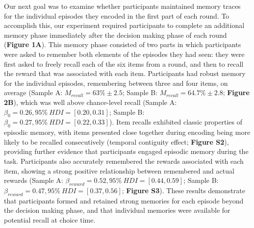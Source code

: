 \documentclass[10pt,letterpaper]{article}
\begin{document}
Our next goal was to examine whether participants maintained memory traces for the individual episodes they encoded in the first part of each round. To accomplish this, our experiment required participants to complete an additional memory phase immediately after the decision making phase of each round (\textbf{Figure 1A}). This memory phase consisted of two parts in which participants were asked to remember both elements of the episodes they had seen: they were first asked to freely recall each of the six items from a round, and then to recall the reward that was associated with each item. Participants had robust memory for the individual episodes, remembering between three and four items, on average (Sample A: $M_{recall} = 63\% \pm 2.5$; Sample B: $M_{recall} = 64.7\% \pm 2.8$; \textbf{Figure 2B}), which was well above chance-level recall (Sample A: $\beta_{0} = 0.26, 95\% \ HDI = [0.20, 0.31]$; Sample B: $\beta_{0} = 0.27, 95\% \ HDI = [0.22, 0.33]$). Item recalls exhibited classic properties of episodic memory, with items presented close together during encoding being more likely to be recalled consecutively (temporal contiguity effect\cite{kahanaFoundationsHumanMemory2012}; \textbf{Figure S2}), providing further evidence that participants engaged episodic memory during the task. Participants also accurately remembered the rewards associated with each item, showing a strong positive relationship between remembered and actual rewards (Sample A: $\beta_{reward} = 0.52, 95\% \ HDI = [0.44, 0.59]$; Sample B: $\beta_{reward} = 0.47, 95\% \ HDI = [0.37, 0.56]$; \textbf{Figure S3}). These results demonstrate that participants formed and retained strong memories for each episode beyond the decision making phase, and that individual memories were available for potential recall at choice time.
\end{document}

